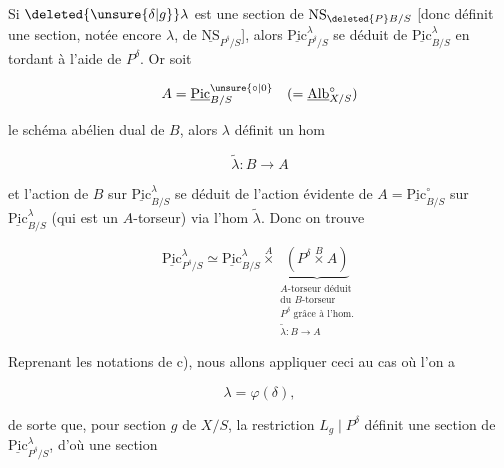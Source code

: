 
Si $\deleted{\unsure{\delta|g}}\lambda$ est une section de $\mathrm{NS}_{\deleted{P}B/S}$ [donc définit une section, notée encore $\lambda$, de $\underline{\mathrm{NS}}_{P^\delta/S}$], alors $\underline{\mathrm{Pic}}^\lambda_{P^\delta/S}$ se déduit de $\underline{\mathrm{Pic}}^\lambda_{B/S}$ en tordant à l'aide de $P^\delta$. Or soit

\[
A=\underline{\mathrm{Pic}}^{\unsure{\circ|0}}_{B/S}\quad(=\underline{\mathrm{Alb}}^\circ_{X/S})
\]

le schéma abélien dual de $B$,  alors $\lambda$ définit un hom

\[
\widetilde\lambda:B\longrightarrow A
\]

et l'action de $B$ sur $\underline{\mathrm{Pic}}^\lambda_{B/S}$ se déduit de l'action évidente de $A=\underline{\mathrm{Pic}}^\circ_{B/S}$ sur $\underline{\mathrm{Pic}}^\lambda_{B/S}$ (qui est un $A$-torseur) via l'hom $\widetilde\lambda$. Donc on trouve

\[
\underline{\mathrm{Pic}}^\lambda_{P^\delta/S}\simeq\underline{\mathrm{Pic}}^\lambda_{B/S}
\overset{A}{\times}
\underbrace{\left(P^\delta\overset{B}{\times} A\right)}_{
\substack{A\text{-torseur déduit}\\\text{du }B\text{-torseur}\\ P^\delta\text{ grâce à l'hom.}\\ \widetilde\lambda:B\to A}}
\]

 Reprenant les notations de c), nous allons appliquer ceci au cas où l'on a

\[
\lambda=\varphi(\delta),
\]

de sorte que, pour  section $g$ de $X/S$, la restriction $L_g\mid P^\delta$ définit une section de $\underline{\mathrm{Pic}}^\lambda_{P^\delta/S}$, d'où une section
